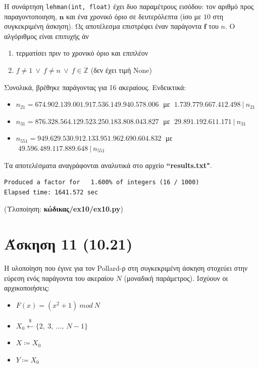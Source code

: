 \documentclass[12pt]{article}
\newcommand{\lt}{\latintext}
\newcommand{\ints}{\mathbb{Z}}
\begin{document}
\noindent
Η συνάρτηση \texttt{\lt lehman(int, float)} έχει δυο παραμέτρους 
εισόδου: τον αριθμό προς παραγοντοποιηση, $\mathbf{n}$ και ένα 
χρονικό όριο σε δευτερόλεπτα (ίσο με $10$ στη 
συγκεκριμένη άσκηση). Ως αποτέλεσμα επιστρέφει έναν 
παράγοντα $\mathbf{f}$ του $n$. Ο αλγόριθμος είναι επιτυχής άν 
\begin{enumerate}
\item τερματίσει πριν το χρονικό όριο και επιπλέον
\item $f \neq 1\:\vee\: f \neq n\:\vee\: f \in \ints$ (δεν έχει τιμή {\lt None})
\end{enumerate}
Συνολικά, βρέθηκε παράγοντας για 16 ακεραίους. Ενδεικτικά:
\begin{itemize}
	\item $n_{21} = 674.902.139.001.917.536.149.940.578.006\;$ με $\;1.739.779.667.412.498\:|\:n_{21}$
	\item $n_{31} = 876.328.564.129.523.250.183.808.043.827\;$ με $\;29.891.192.611.171\:|\:n_{31}$
	\item $n_{551} = 949.629.530.912.133.951.962.690.604.832\;$ με $\;49.596.489.117.889.648\:|\:n_{551}$
\end{itemize}

\noindent
Τα αποτελέσματα αναγράφονται αναλυτικά στο αρχείο \textbf{\lt ``results.txt"}.

{ \lt
\begin{verbatim}
Produced a factor for   1.600% of integers (16 / 1000)
Elapsed time: 1641.572 sec
\end{verbatim}
}

\vspace{0.1in}
\noindent
(Υλοποίηση: \textbf{κώδικας/{\lt ex10/ex10.py}})

\section*{Άσκηση 11 (10.21)}

Η υλοποίηση που έγινε για τον {\lt Pollard-}ρ στη συγκεκριμένη άσκηση στοχεύει στην εύρεση ενός παράγοντα του ακεραίου $N$ (μοναδική παράμετρος). Ισχύουν οι αρχικοποιήσεις:
\begin{itemize}
	\item $F(x) = (x^2 + 1)\:mod\:N$
	\item $X_0 \xleftarrow{\$} \{2,\:3,\:...,\:N-1\}$
	\item $X \coloneqq X_0$
	\item $Y \coloneqq X_0$
\end{itemize}
\end{document}
